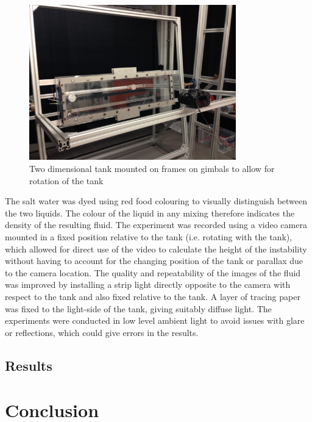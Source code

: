 \documentclass[11pt]{article}
\begin{document}
\begin{figure}
\centering
\includegraphics[width=0.8\textwidth]{gimbal_frame}
\caption{Two dimensional tank mounted on frames on gimbals to allow for rotation of the tank}
\label{fig:gimbalframes1}	
\end{figure}

The salt water was dyed using red food colouring to visually distinguish between the two liquids. The colour of the liquid in any mixing therefore indicates the density of the resulting fluid. The experiment was recorded using a video camera mounted in a fixed position relative to the tank (i.e. rotating with the tank), which allowed for direct use of the video to calculate the height of the instability without having to account for the changing position of the tank or parallax due to the camera location. The quality and repeatability of the images of the fluid was improved by installing a strip light directly opposite to the camera with respect to the tank and also fixed relative to the tank. A layer of tracing paper was fixed to the light-side of the tank, giving suitably diffuse light. The experiments were conducted in low level ambient light to avoid issues with glare or reflections, which could give errors in the results.
	
\subsection*{Results}



\section*{Conclusion}




\end{document}
